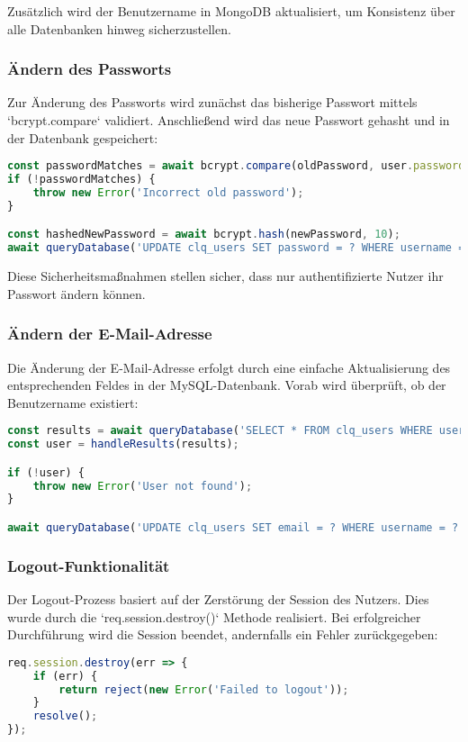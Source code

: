 Zusätzlich wird der Benutzername in MongoDB aktualisiert, um Konsistenz über alle Datenbanken hinweg sicherzustellen.

\subsubsection{Ändern des Passworts}\label{subsubsec:password-update}

Zur Änderung des Passworts wird zunächst das bisherige Passwort mittels `bcrypt.compare` validiert.
Anschließend wird das neue Passwort gehasht und in der Datenbank gespeichert:

\begin{lstlisting}[language=JavaScript, caption=Passwortvalidierung und Update]
const passwordMatches = await bcrypt.compare(oldPassword, user.password);
if (!passwordMatches) {
    throw new Error('Incorrect old password');
}

const hashedNewPassword = await bcrypt.hash(newPassword, 10);
await queryDatabase('UPDATE clq_users SET password = ? WHERE username = ?', [hashedNewPassword, username]);
\end{lstlisting}

Diese Sicherheitsmaßnahmen stellen sicher, dass nur authentifizierte Nutzer ihr Passwort ändern können.

\subsubsection{Ändern der E-Mail-Adresse}\label{subsubsec:email-update}

Die Änderung der E-Mail-Adresse erfolgt durch eine einfache Aktualisierung des entsprechenden Feldes in der MySQL-Datenbank.
Vorab wird überprüft, ob der Benutzername existiert:

\begin{lstlisting}[language=JavaScript, caption=Update der E-Mail-Adresse]
const results = await queryDatabase('SELECT * FROM clq_users WHERE username = ?', [username]);
const user = handleResults(results);

if (!user) {
    throw new Error('User not found');
}

await queryDatabase('UPDATE clq_users SET email = ? WHERE username = ?', [newEmail, username]);
\end{lstlisting}

\subsubsection{Logout-Funktionalität}\label{subsubsec:logout}

Der Logout-Prozess basiert auf der Zerstörung der Session des Nutzers.
Dies wurde durch die `req.session.destroy()` Methode realisiert.
Bei erfolgreicher Durchführung wird die Session beendet, andernfalls ein Fehler zurückgegeben:

\begin{lstlisting}[language=JavaScript, caption=Logout-Service über Session-Zerstörung]
req.session.destroy(err => {
    if (err) {
        return reject(new Error('Failed to logout'));
    }
    resolve();
});
\end{lstlisting}